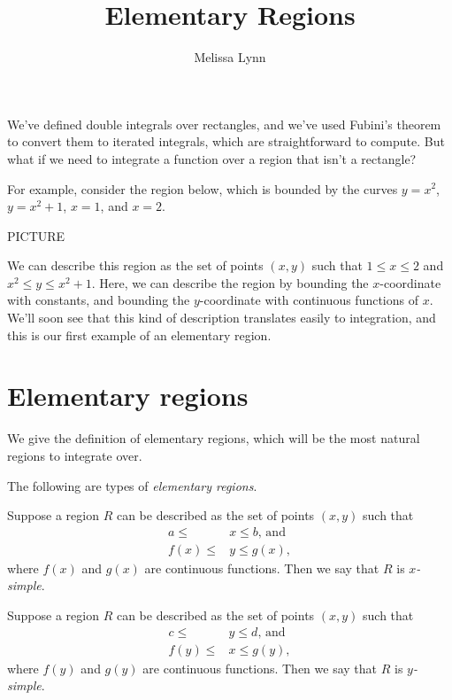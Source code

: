 \documentclass{ximera}
\title{Elementary Regions}
\author{Melissa Lynn}
\begin{document}
  
\begin{abstract}  
\end{abstract}  
\maketitle  

We've defined double integrals over rectangles, and we've used Fubini's theorem to convert them to iterated integrals, which are straightforward to compute. But what if we need to integrate a function over a region that isn't a rectangle?

For example, consider the region below, which is bounded by the curves $y=x^2$, $y=x^2+1$, $x=1$, and $x=2$.

PICTURE

We can describe this region as the set of points $(x,y)$ such that $1\leq x\leq 2$ and $x^2\leq y\leq x^2+1$. Here, we can describe the region by bounding the $x$-coordinate with constants, and bounding the $y$-coordinate with continuous functions of $x$. We'll soon see that this kind of description translates easily to integration, and this is our first example of an elementary region.

\section*{Elementary regions}

We give the definition of elementary regions, which will be the most natural regions to integrate over.

\begin{definition}
The following are types of \emph{elementary regions}.

Suppose a region $R$ can be described as the set of points $(x,y)$ such that
\begin{align*}
a\leq &x\leq b\text{, and}\\
f(x)\leq &y \leq g(x),
\end{align*}
where $f(x)$ and $g(x)$ are continuous functions. Then we say that $R$ is \emph{$x$-simple}.

Suppose a region $R$ can be described as the set of points $(x,y)$ such that
\begin{align*}
c\leq & y\leq d\text{, and}\\
f(y)\leq & x \leq g(y),
\end{align*}
where $f(y)$ and $g(y)$ are continuous functions. Then we say that $R$ is \emph{$y$-simple}.
\end{definition}
\end{document}
